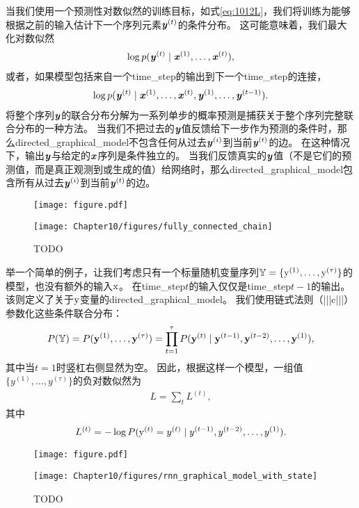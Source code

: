 当我们使用一个预测性对数似然的训练目标，如式\eqref{eq:1012L}，我们将训练为能够根据之前的输入估计下一个序列元素$\boldsymbol{\mathit{y}}^{(t)}$的条件分布。
这可能意味着，我们最大化对数似然
\begin{align}
 \log p(\boldsymbol{\mathit{y}}^{(t)} \mid \boldsymbol{\mathit{x}}^{(1)},\dots, \boldsymbol{\mathit{x}}^{(t)}),
\end{align}
或者，如果模型包括来自一个\gls{time_step}的输出到下一个\gls{time_step}的连接，
\begin{align}
 \log p(\boldsymbol{\mathit{y}}^{(t)} \mid \boldsymbol{\mathit{x}}^{(1)},\dots, \boldsymbol{\mathit{x}}^{(t)},\boldsymbol{\mathit{y}}^{(1)},\dots, \boldsymbol{\mathit{y}}^{(t-1)} ).
\end{align}
将整个序列$\boldsymbol{\mathit{y}}$的联合分布分解为一系列单步的概率预测是捕获关于整个序列完整联合分布的一种方法。
当我们不把过去的$\boldsymbol{\mathit{y}}$值反馈给下一步作为预测的条件时，那么\gls{directed_graphical_model}不包含任何从过去$\boldsymbol{\mathit{y}}^{(i)}$到当前$\boldsymbol{\mathit{y}}^{(t)}$的边。
在这种情况下，输出$\boldsymbol{\mathit{y}}$与给定的$\boldsymbol{\mathit{x}}$序列是条件独立的。
当我们反馈真实的$\boldsymbol{\mathit{y}}$值（不是它们的预测值，而是真正观测到或生成的值）给网络时，那么\gls{directed_graphical_model}包含所有从过去$\boldsymbol{\mathit{y}}^{(i)}$到当前$\boldsymbol{\mathit{y}}^{(t)}$的边。
\begin{figure}[!htb]
\ifOpenSource
\centerline{\texttt{[image: figure.pdf]}}
\else
\centerline{\texttt{[image: Chapter10/figures/fully\_connected\_chain]}}
\fi
\caption{TODO}
\label{fig:chap10_fully_connected_chain}
\end{figure}


举一个简单的例子，让我们考虑只有一个标量随机变量序列$ \mathbb{Y} = \{\mathrm{y}^{(1)},\dots,\mathrm{y}^{(\tau)}\}$的模型，也没有额外的输入$\mathrm{x}$。
在\gls{time_step}$t$的输入仅仅是\gls{time_step}$t-1$的输出。
该则定义了关于$\mathrm{y}$变量的\gls{directed_graphical_model}。
我们使用链式法则（|||c|||）参数化这些条件联合分布：
\begin{align}
 P(\mathbb{Y}) = P(\mathbf{y}^{(1)},\dots,\mathbf{y}^{(\tau)}) = \prod_{t=1}^{\tau}P(\mathbf{y}^{(t)} \mid \mathbf{y}^{(t-1)},\mathbf{y}^{(t-2)},
 \dots,\mathbf{y}^{(1)}),
\end{align}
其中当$t=1$时竖杠右侧显然为空。
因此，根据这样一个模型，一组值$\{y^{(1)},\dots,y^{(\tau)} \}$的负对数似然为
\begin{align}
 L = \sum_{t} L^{(t)},
\end{align}
其中
\begin{align}
 L^{(t)} = -\log P(\mathrm{y}^{(t)} = y^{(t)} \mid y^{(t-1)},y^{(t-2)}, \dots, y^{(1)}).
\end{align}
\begin{figure}[!htb]
\ifOpenSource
\centerline{\texttt{[image: figure.pdf]}}
\else
\centerline{\texttt{[image: Chapter10/figures/rnn\_graphical\_model\_with\_state]}}
\fi
\caption{TODO}
\label{fig:chap10_rnn_graphical_model_with_state}
\end{figure}

